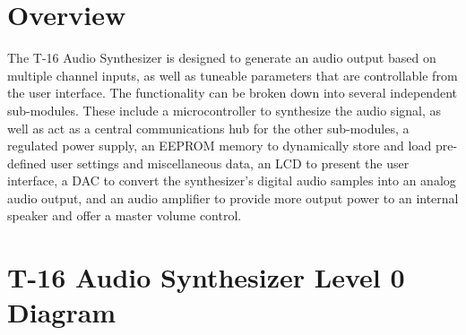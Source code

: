 \documentclass{article}
\begin{document}
\newenvironment{frcseries}{\fontfamily{frc}\selectfont}{}
\newcommand{\textfrc}[1]{{\frcseries#1}}
\newcommand{\mathfrc}[1]{\text{\textfrc{#1}}}

\section{Overview}
The T-16 Audio Synthesizer is designed to generate an audio output based on multiple channel inputs, as well as tuneable parameters that are controllable from the user interface.  The functionality can be broken down into several independent sub-modules.  These include a microcontroller to synthesize the audio signal, as well as act as a central communications hub for the other sub-modules, a regulated power supply, an EEPROM memory to dynamically store and load pre-defined user settings and miscellaneous data, an LCD to present the user interface, a DAC to convert the synthesizer's digital audio samples into an analog audio output, and an audio amplifier to provide more output power to an internal speaker and offer a master volume control.

\section{T-16 Audio Synthesizer Level 0 Diagram}
\end{document}
